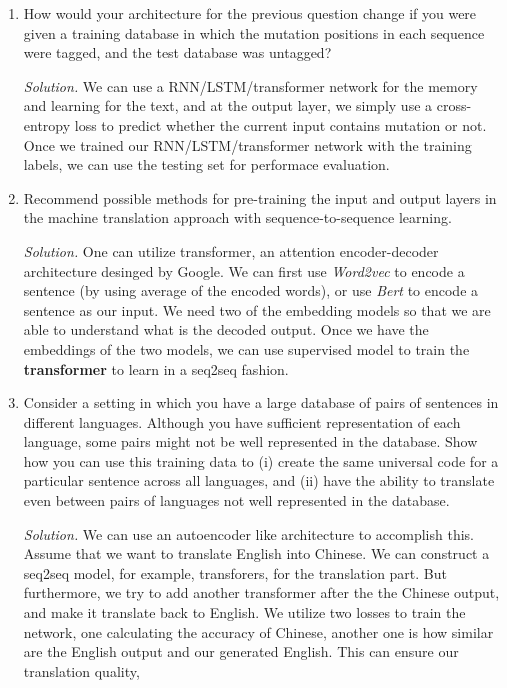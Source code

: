 \documentclass[12pt]{article}
\newcommand\sol[1] {
    \begin{mdframed}
        \emph{Solution.} #1
    \end{mdframed}
}
\begin{document}
\begin{enumerate}[ref=\theenumi]
    \item How would your architecture for the previous question change if you were given a
            training database in which the mutation positions in each sequence were tagged, and
            the test database was untagged?
        \sol {
            We can use a RNN/LSTM/transformer network for the memory and learning
            for the text, and at the output layer, we simply use a cross-entropy
            loss to predict whether the current input contains mutation or not.
            Once we trained our RNN/LSTM/transformer network with the training labels, 
            we can use the testing set for performace evaluation.
        }
    \item Recommend possible methods for pre-training the input and output layers in the
            machine translation approach with sequence-to-sequence learning.
        \sol{
            One can utilize transformer, an attention encoder-decoder architecture desinged 
            by Google. We can first use \textit{Word2vec} to encode a sentence (by using 
            average of the encoded words), or use \textit{Bert} to encode a sentence as our input.
            We need two of the embedding models so that we are able to understand what is 
            the decoded output. Once we have the embeddings of the two models, we can use
            supervised model to train the \textbf{transformer} to learn in a seq2seq fashion.
        }
    \item Consider a setting in which you have a large database of pairs of sentences in different
            languages. Although you have sufficient representation of each language, some pairs
            might not be well represented in the database. Show how you can use this training data
            to (i) create the same universal code for a particular sentence across all languages, and
            (ii) have the ability to translate even between pairs of languages not well represented
            in the database.
        \sol{
            We can use an autoencoder like architecture to accomplish this. Assume that we want
            to translate English into Chinese. We can construct a seq2seq model, for example, 
            transforers, for the translation part. But furthermore, we try to add another transformer
            after the the Chinese output, and make it translate back to English. We utilize two losses
            to train the network, one calculating the accuracy of Chinese, another one is how similar
            are the English output and our generated English. This can ensure our translation quality,
}
\end{enumerate}
\end{document}

